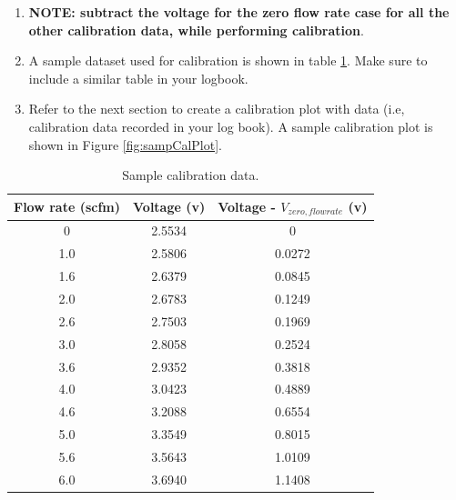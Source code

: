 \documentclass{article} %
\begin{document}
\begin{enumerate}
\begin{enumerate}
\begin{enumerate}[label=\alph*.]
            \item Compute the Average Voltage:
            \begin{itemize}
                \item Write a MATLAB script to calculate the mean voltage from each data file.
                \item Record the result with at least two decimal places.
            \end{itemize}
        \end{enumerate}
        \item Take at least ten points evenly distributed across the flow range of the apparatus.
    \end{enumerate}
    \item {\bf NOTE: subtract the voltage for the zero flow rate case for all the other calibration data, while performing calibration}.
    \item A sample dataset used for calibration is shown in table \ref{tab:calData}. Make sure to include a similar table in your logbook.
    \item Refer to the next section to create a calibration plot with data (i.e, calibration data recorded in your log book). A sample calibration plot is shown in Figure \ref{fig:sampCalPlot}.
\end{enumerate}

\begin{table}
\centering
\caption{Sample calibration data.}
\begin{tabular}{c|cc}
Flow rate (scfm) & Voltage (v) & Voltage - $V_{zero, flowrate}$ (v)\\\toprule
0 & 2.5534 & 0 \\
1.0 & 2.5806 & 0.0272\\
1.6 & 2.6379 & 0.0845\\
2.0 & 2.6783 & 0.1249 \\
2.6 & 2.7503 & 0.1969 \\
3.0 & 2.8058 & 0.2524\\
3.6 & 2.9352 & 0.3818\\
4.0 & 3.0423 & 0.4889\\
4.6 & 3.2088 & 0.6554\\
5.0 & 3.3549 & 0.8015\\
5.6 & 3.5643 & 1.0109\\
6.0 & 3.6940 & 1.1408\\
\end{tabular}
\label{tab:calData}
\end{table}
\end{document}
